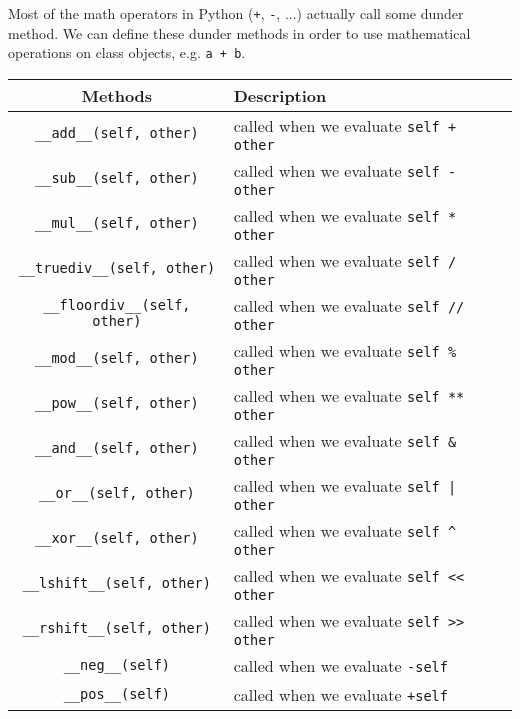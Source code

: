   \begin{definition} 
    Most of the math operators in Python (\texttt{+}, \texttt{-}, ...) actually call some dunder method. We can define these dunder methods in order to use mathematical operations on class objects, e.g. \texttt{a + b}. 

    \begin{table}[H]
      \centering
      \begin{tabular}{|c|p{8cm}|}
        \hline
        \textbf{Methods} & \textbf{Description} \\
        \hline 
        \texttt{\_\_add\_\_(self, other)} & called when we evaluate \texttt{self + other} \\
        \hline
        \texttt{\_\_sub\_\_(self, other)} & called when we evaluate \texttt{self - other} \\
        \hline
        \texttt{\_\_mul\_\_(self, other)} & called when we evaluate \texttt{self * other} \\
        \hline
        \texttt{\_\_truediv\_\_(self, other)} & called when we evaluate \texttt{self / other} \\
        \hline
        \texttt{\_\_floordiv\_\_(self, other)} & called when we evaluate \texttt{self // other} \\
        \hline
        \texttt{\_\_mod\_\_(self, other)} & called when we evaluate \texttt{self \% other} \\
        \hline
        \texttt{\_\_pow\_\_(self, other)} & called when we evaluate \texttt{self ** other} \\
        \hline
        \texttt{\_\_and\_\_(self, other)} & called when we evaluate \texttt{self \& other} \\
        \hline
        \texttt{\_\_or\_\_(self, other)} & called when we evaluate \texttt{self | other} \\
        \hline
        \texttt{\_\_xor\_\_(self, other)} & called when we evaluate \texttt{self \^{} other} \\
        \hline
        \texttt{\_\_lshift\_\_(self, other)} & called when we evaluate \texttt{self << other} \\
        \hline
        \texttt{\_\_rshift\_\_(self, other)} & called when we evaluate \texttt{self >> other} \\
        \hline
        \texttt{\_\_neg\_\_(self)} & called when we evaluate \texttt{-self} \\
        \hline
        \texttt{\_\_pos\_\_(self)} & called when we evaluate \texttt{+self} \\

\end{tabular}
\end{table}
\end{definition}
